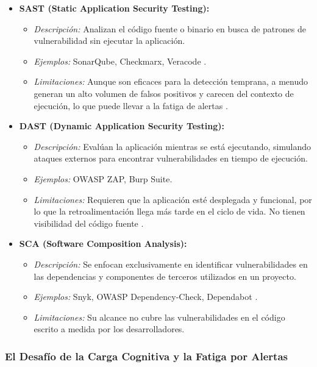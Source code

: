 \begin{itemize}
    \item \textbf{SAST (Static Application Security Testing):}
    \begin{itemize}
        \item \textit{Descripción:} Analizan el código fuente o binario en busca de patrones de vulnerabilidad sin ejecutar la aplicación.
        \item \textit{Ejemplos:} SonarQube, Checkmarx, Veracode \cite{SonarSourceDocSonarQube}.
        \item \textit{Limitaciones:} Aunque son eficaces para la detección temprana, a menudo generan un alto volumen de falsos positivos y carecen del contexto de ejecución, lo que puede llevar a la fatiga de alertas \cite{Johnson2023UsabilitySAST}.
    \end{itemize}

    \item \textbf{DAST (Dynamic Application Security Testing):}
    \begin{itemize}
        \item \textit{Descripción:} Evalúan la aplicación mientras se está ejecutando, simulando ataques externos para encontrar vulnerabilidades en tiempo de ejecución.
        \item \textit{Ejemplos:} OWASP ZAP, Burp Suite.
        \item \textit{Limitaciones:} Requieren que la aplicación esté desplegada y funcional, por lo que la retroalimentación llega más tarde en el ciclo de vida. No tienen visibilidad del código fuente \cite{Kumar2022DevSecOpsReview}.
    \end{itemize}

    \item \textbf{SCA (Software Composition Analysis):}
    \begin{itemize}
        \item \textit{Descripción:} Se enfocan exclusivamente en identificar vulnerabilidades en las dependencias y componentes de terceros utilizados en un proyecto.
        \item \textit{Ejemplos:} Snyk, OWASP Dependency-Check, Dependabot \cite{SnykDoc}.
        \item \textit{Limitaciones:} Su alcance no cubre las vulnerabilidades en el código escrito a medida por los desarrolladores.
    \end{itemize}
\end{itemize}

\subsubsection{El Desafío de la Carga Cognitiva y la Fatiga por Alertas}

